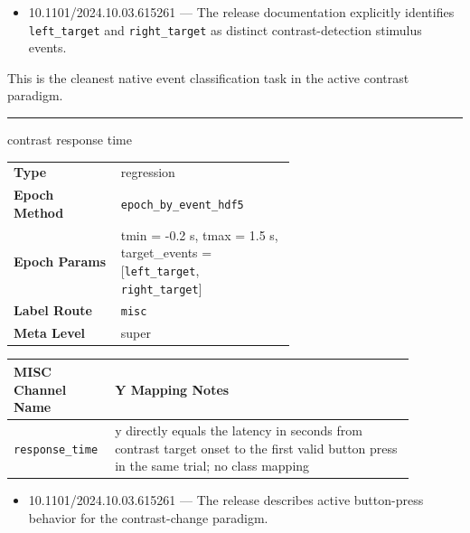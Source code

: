 {\begin{tcolorbox}
\begin{tabular}{@{}p{0.3911\linewidth}p{0.0978\linewidth}p{0.3911\linewidth}@{}}
\bottomrule
\end{tabular}
\endgroup
\par{}\par
\begin{itemize}[leftmargin=1.3em,noitemsep,topsep=1pt]
\item[\scriptsize$\cdot$] {\scriptsize 10.1101/2024.10.03.615261 --- The release documentation explicitly identifies \texttt{left\_target} and \texttt{right\_target} as distinct contrast-detection stimulus events.}
\end{itemize}
\par{} {\footnotesize This is the cleanest native event classification task in the active contrast paradigm.}
\noindent\rule{\linewidth}{0.7pt}\par\nopagebreak
{} {\footnotesize contrast response time}\par\smallskip
{\footnotesize\begin{tabular}{@{}lp{0.62\linewidth}@{}}
\textbf{Type} & regression \\
\textbf{Epoch Method} & \texttt{epoch\_by\_event\_hdf5} \\
\textbf{Epoch Params} & tmin = -0.2 s, tmax = 1.5 s, target\_events = [\texttt{left\_target}, \texttt{right\_target}] \\
\textbf{Label Route} & \texttt{misc} \\
\textbf{Meta Level} & super \\
\end{tabular}}
\par{}\par\smallskip
\begingroup\footnotesize
\begin{tabular}{@{}p{0.1760\linewidth}p{0.7040\linewidth}@{}}
\toprule
\textbf{MISC Channel Name} & \textbf{Y Mapping Notes} \\
\midrule
\texttt{response\_time} & y directly equals the latency in seconds from contrast target onset to the first valid button press in the same trial; no class mapping \\
\bottomrule
\end{tabular}
\endgroup
\par{}\par
\begin{itemize}[leftmargin=1.3em,noitemsep,topsep=1pt]
\item[\scriptsize$\cdot$] {\scriptsize 10.1101/2024.10.03.615261 --- The release describes active button-press behavior for the contrast-change paradigm.}

\end{itemize}
\end{tcolorbox}}
